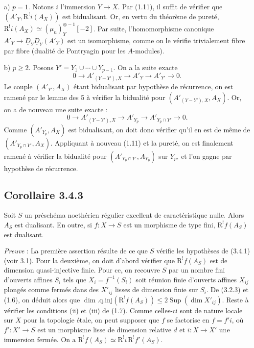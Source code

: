 a) $p = 1$. Notons $i$ l'immersion $Y \to X$. Par (1.11), il suffit de vérifier que $(A'_Y, \mathrm{R}^{!}i(A_X))$ est bidualisant. Or, en vertu du théorème de pureté, $\mathrm{R}^{!}i(A_X) \simeq (\mu_n)^{\otimes -1}_Y[-2]$. Par suite, l'homomorphisme canonique $A'_Y \to \underline{D}_Y \underline{D}_Y(A'_Y)$ est un isomorphisme, comme on le vérifie trivialement fibre par fibre (dualité de Pontryagin pour les $A$-modules).

b) $p \geqslant 2$. Posons $Y' = Y_1 \cup \cdots \cup Y_{p-1}$. On a la suite exacte
\[
0 \longrightarrow A'_{(Y-Y'),X} \longrightarrow A'_Y \longrightarrow A'_{Y'} \longrightarrow 0.
\]
Le couple $(A'_{Y'}, A_X)$ étant bidualisant par hypothèse de récurrence, on est ramené par le lemme des 5 à vérifier la bidualité pour $(A'_{(Y-Y'),X}, A_X)$. Or, on a de nouveau une suite exacte :
\[
0 \longrightarrow A'_{(Y-Y'),X} \longrightarrow A'_{Y_p} \longrightarrow A'_{Y_p \cap Y'} \longrightarrow 0.
\]
Comme $(A'_{Y_p}, A_X)$ est bidualisant, on doit donc vérifier qu'il en est de même de $(A'_{Y_p \cap Y'}, A_X)$. Appliquant à nouveau (1.11) et la pureté, on est finalement ramené à vérifier la bidualité pour $(A'_{Y_p \cap Y'}, A_{Y_p})$ sur $Y_p$, et l'on gagne par hypothèse de récurrence.

\subsection*{Corollaire 3.4.3}
Soit $S$ un préschéma noethérien régulier excellent de caractéristique nulle. Alors $A_S$ est dualisant. En outre, si $f : X \to S$ est un morphisme de type fini, $\mathrm{R}^{!}f(A_S)$ est dualisant.

\emph{Preuve} : La première assertion résulte de ce que $S$ vérifie les hypothèses de (3.4.1) (voir 3.1). Pour la deuxième, on doit d'abord vérifier que $\mathrm{R}^{!}f(A_S)$ est de dimension quasi-injective finie. Pour ce, on recouvre $S$ par un nombre fini d'ouverts affines $S_i$ tels que $X_i = f^{-1}(S_i)$ soit réunion finie d'ouverts affines $X_{ij}$ plongés comme fermés dans des $X'_{ij}$ lisses de dimension finie sur $S_i$. De (3.2.3) et (1.6), on déduit alors que $\dim.\mathrm{q.inj}(\mathrm{R}^{!}f(A_S)) \leqslant 2\operatorname{Sup}(\dim X'_{ij})$. Reste à vérifier les conditions (ii) et (iii) de (1.7). Comme celles-ci sont de nature locale sur $X$ pour la topologie étale, on peut supposer que $f$ se factorise en $f = f'i$, où $f' : X' \to S$ est un morphisme lisse de dimension relative $d$ et $i : X \to X'$ une immersion fermée. On a $\mathrm{R}^{!}f(A_S) \simeq \mathrm{R}^{!}i \, \mathrm{R}^{!}f'(A_S)$.

